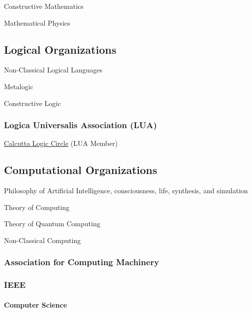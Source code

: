 Constructive Mathematics

Mathematical Physics

\hypertarget{logical-organizations}{%
\subsection{Logical Organizations}\label{logical-organizations}}

Non-Classical Logical Languages

Metalogic

Constructive Logic

\hypertarget{logica-universalis-association-lua}{%
\subsubsection{Logica Universalis Association
(LUA)}\label{logica-universalis-association-lua}}

\href{https://sites.google.com/view/calcuttalogiccircleclc/home}{\ul{Calcutta
Logic Circle}} (LUA Member)

\hypertarget{computational-organizations}{%
\subsection{Computational
Organizations}\label{computational-organizations}}

Philosophy of Artificial Intelligence, consciousness, life, synthesis,
and simulation

Theory of Computing

Theory of Quantum Computing

Non-Classical Computing

\hypertarget{association-for-computing-machinery}{%
\subsubsection{Association for Computing
Machinery}\label{association-for-computing-machinery}}

\hypertarget{ieee}{%
\subsubsection{IEEE}\label{ieee}}

\hypertarget{computer-science}{%
\paragraph{Computer Science}\label{computer-science}}

